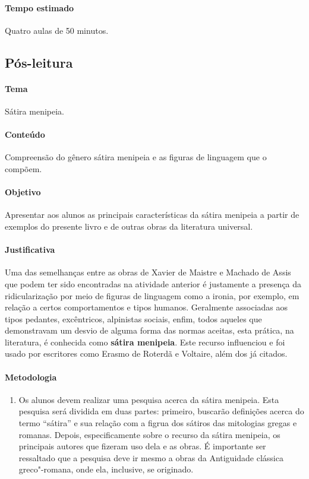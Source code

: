 \documentclass[12pt]{extarticle}
\begin{document}
\paragraph{Tempo estimado} Quatro aulas de 50 minutos.



\subsection{Pós-leitura}



\paragraph{Tema} Sátira menipeia.

\paragraph{Conteúdo} Compreensão do gênero sátira menipeia e as figuras de linguagem
que o compõem.

\paragraph{Objetivo} Apresentar aos alunos as principais características
da sátira menipeia a partir de exemplos do presente livro e de outras obras
da literatura universal.

\paragraph{Justificativa} Uma das semelhanças entre as obras de Xavier de Maistre 
e Machado de Assis que podem ter sido encontradas na atividade
anterior é justamente a presença da ridicularização por meio de figuras de 
linguagem como a ironia, por exemplo, em relação a certos comportamentos e tipos humanos. 
Geralmente associadas aos tipos pedantes, excêntricos,
alpinistas sociais, enfim, todos aqueles que demonstravam um desvio de alguma forma
das normas aceitas, esta prática, na literatura, é conhecida como 
\textbf{sátira menipeia}. Este recurso influenciou e foi usado por
escritores como Erasmo de Roterdã e Voltaire, além dos já citados.

\paragraph{Metodologia}
\begin{enumerate}
	\item
	Os alunos devem realizar uma pesquisa acerca da sátira menipeia.
	Esta pesquisa será dividida em duas partes: primeiro, buscarão
	definições acerca do termo ``sátira'' e sua relação com a figrua
	dos sátiros das mitologias gregas e romanas. 
	Depois, especificamente sobre o recurso da sátira menipeia,
	os principais autores que fizeram uso dela e as obras. 
	É importante ser ressaltado que a pesquisa deve ir mesmo a obras
	da Antiguidade clássica greco"-romana, onde ela, inclusive, se originado.
\end{enumerate}
\end{document}
